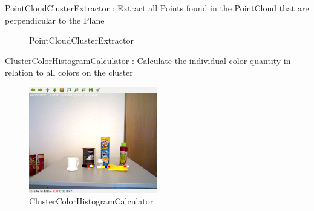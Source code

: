 \documentclass[main.tex]{subfiles}
\begin{document}
\begin{itemize}
	\begin{minipage}[t]{\textwidth}
	\item PointCloudClusterExtractor : Extract all Points found in the PointCloud that are perpendicular to the Plane 
		\begin{figure}[H]
   			 \centering
   			 \caption{PointCloudClusterExtractor}
  		\end{figure}
	\end{minipage}

	\begin{minipage}[t]{\textwidth}
	\item ClusterColorHistogramCalculator : Calculate the individual color quantity in relation to all colors on the cluster   
		\begin{figure}[H]
   			 \centering
    			\includegraphics[width=0.5\textwidth]{pictures/2d/ClusterColorHistogramAnnotator.png}
   			 \caption{ClusterColorHistogramCalculator}
  		\end{figure}
	\end{minipage}


\end{itemize}
\end{document}
